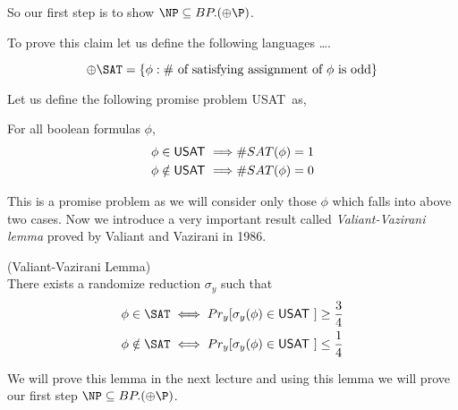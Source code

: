 \documentclass[11pt]{article}
\newcommand{\USAT}{{\sf USAT}~}
\begin{document}
So our first step is to show $\NP \subseteq BP.(\oplus \P)$.

To prove this claim let us define the following languages \ldots.
\begin{definition} 
\[ \oplus \SAT = \{ \phi : \# \text{ of satisfying assignment of }
\phi \text{ is odd} \}\]
\end{definition}

Let us define the following promise problem \USAT as,
\begin{definition}
For all boolean formulas $\phi$,
\begin{align*}
\phi & \in \USAT \Longrightarrow \#SAT(\phi)=1\\
\phi & \notin \USAT \Longrightarrow \#SAT(\phi)=0
\end{align*}
\end{definition}

This is a promise problem as we will consider only those $\phi$ which 
falls into above two cases. Now we introduce a very important result called 
\emph{Valiant-Vazirani lemma} proved by Valiant and Vazirani in 1986.

\begin{lemma}(Valiant-Vazirani Lemma) \\
There exists a randomize reduction $\sigma_y$ such that
\begin{align*}
\phi & \in \SAT \iff Pr_y[\sigma_y(\phi) \in \USAT] \ge \frac{3}{4}\\
\phi & \notin \SAT \iff Pr_y[\sigma_y(\phi) \in \USAT] \le \frac{1}{4}
\end{align*}
\end{lemma}
We will prove this lemma in the next lecture and using this lemma 
we will prove our first step $\NP \subseteq BP.(\oplus\P)$.
\end{document}
